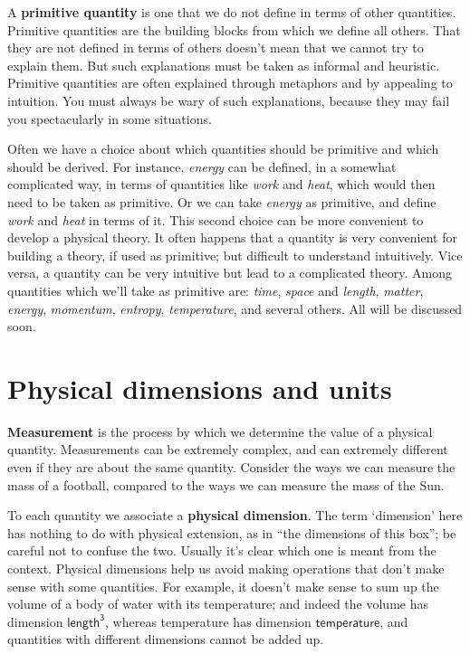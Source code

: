 \documentclass[a4paper,12pt,%
onecolumn,oneside,titlepage,%
british%
]{memoir}
\renewcommand*{\|}[1][]{\nonscript\:#1\vert\nonscript\:\mathopen{}}
\begin{document}
A \textbf{primitive quantity} is one that we do not define in terms of other quantities. Primitive quantities are the building blocks from which we define all others. That they are not defined in terms of others doesn't mean that we cannot try to explain them. But such explanations must be taken as informal and heuristic. Primitive quantities are often explained through metaphors and by appealing to intuition. You must always be wary of such explanations, because they may fail you spectacularly in some situations.

Often we have a choice about which quantities should be primitive and which should be derived. For instance, \emph{energy} can be defined, in a somewhat complicated way, in terms of quantities like \emph{work} and \emph{heat}, which would then need to be taken as primitive. Or we can take \emph{energy} as primitive, and define \emph{work} and \emph{heat} in terms of it. This second choice can be more convenient to develop a physical theory. It often happens that a quantity is very convenient for building a theory, if used as primitive; but difficult to understand intuitively. Vice versa,  a quantity can be very intuitive but lead to a complicated theory.
Among quantities which we'll take as primitive are:
\emph{time}, \emph{space} and \emph{length}, \emph{matter}, \emph{energy}, \emph{momentum},
\emph{entropy}, \emph{temperature}, and several others. All will be discussed soon.

 \section{Physical dimensions and units}
\label{sec:units}

\textbf{Measurement} is the process by which we determine the value of a physical quantity. Measurements can be extremely complex, and can extremely different even if they are about the same quantity. Consider the ways we can measure the mass of a football, compared to the ways we can measure the mass of the Sun.

To each quantity we associate a \textbf{physical dimension}. The term \enquote*{dimension} here has nothing to do with physical extension, as in \enquote{the dimensions of this box}; be careful not to confuse the two. Usually it's clear which one is meant from the context. Physical dimensions help us avoid making operations that don't make sense with some quantities. For example, it doesn't make sense to sum up the volume of a body of water with its temperature; and indeed the volume has dimension $\mathsf{length^{3}}$, whereas temperature has dimension $\mathsf{temperature}$, and quantities with different dimensions cannot be added up.
\end{document}

